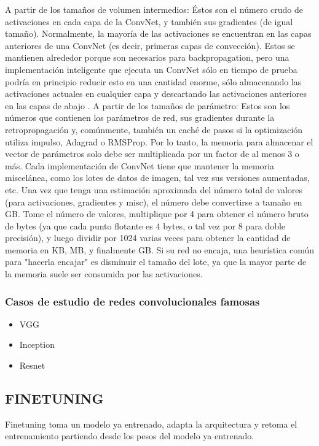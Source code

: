 \documentclass[a4paper,10pt]{article}
\begin{document}
A partir de los tamaños de volumen intermedios: Éstos son el número crudo de activaciones en cada capa de la ConvNet, y también sus gradientes (de igual tamaño). Normalmente, la mayoría de las activaciones se encuentran en las capas anteriores de una ConvNet (es decir, primeras capas de convección). Estos se mantienen alrededor porque son necesarios para backpropagation, pero una implementación inteligente que ejecuta un ConvNet sólo en tiempo de prueba podría en principio reducir esto en una cantidad enorme, sólo almacenando las activaciones actuales en cualquier capa y descartando las activaciones anteriores en las capas de abajo .
A partir de los tamaños de parámetro: Estos son los números que contienen los parámetros de red, sus gradientes durante la retropropagación y, comúnmente, también un caché de pasos si la optimización utiliza impulso, Adagrad o RMSProp. Por lo tanto, la memoria para almacenar el vector de parámetros solo debe ser multiplicada por un factor de al menos 3 o más.
Cada implementación de ConvNet tiene que mantener la memoria miscelánea, como los lotes de datos de imagen, tal vez sus versiones aumentadas, etc.
Una vez que tenga una estimación aproximada del número total de valores (para activaciones, gradientes y misc), el número debe convertirse a tamaño en GB. Tome el número de valores, multiplique por 4 para obtener el número bruto de bytes (ya que cada punto flotante es 4 bytes, o tal vez por 8 para doble precisión), y luego dividir por 1024 varias veces para obtener la cantidad de memoria en KB, MB, y finalmente GB. Si su red no encaja, una heurística común para "hacerla encajar" es disminuir el tamaño del lote, ya que la mayor parte de la memoria suele ser consumida por las activaciones.

\subsubsection {Casos de estudio de redes convolucionales famosas}
\begin{itemize}
 \item VGG
 \item Inception
 \item Resnet
\end{itemize}

\subsection {FINETUNING}
Finetuning toma un modelo ya entrenado, adapta la arquitectura y retoma el entrenamiento partiendo desde los pesos del modelo ya entrenado.
\end{document}
